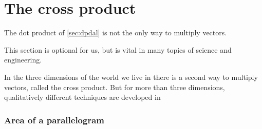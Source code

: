 \section{The cross product}
\label{sec:cp}
\secttoc



The dot product of \cref{sec:dpdal} is not the only way to multiply vectors.
\begin{aside}
This section is optional for us, 
but is vital in many topics of science and engineering.
\end{aside}%
In the three dimensions of the world we live in there is a second way to multiply vectors, called the cross product.
But for more than three dimensions, qualitatively different techniques are developed in 


\subsubsection{Area of a parallelogram}

